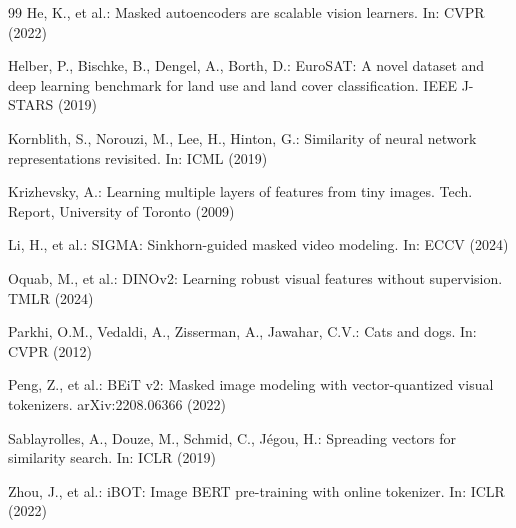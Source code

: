 \documentclass[runningheads]{llncs}
\begin{document}
\begin{thebibliography}{99}
He, K., et al.:
Masked autoencoders are scalable vision learners.
In: CVPR (2022)

Helber, P., Bischke, B., Dengel, A., Borth, D.:
EuroSAT: A novel dataset and deep learning benchmark for land use and land cover classification.
IEEE J-STARS (2019)

Kornblith, S., Norouzi, M., Lee, H., Hinton, G.:
Similarity of neural network representations revisited.
In: ICML (2019)

Krizhevsky, A.:
Learning multiple layers of features from tiny images.
Tech. Report, University of Toronto (2009)

Li, H., et al.:
SIGMA: Sinkhorn-guided masked video modeling.
In: ECCV (2024)

Oquab, M., et al.:
DINOv2: Learning robust visual features without supervision.
TMLR (2024)

Parkhi, O.M., Vedaldi, A., Zisserman, A., Jawahar, C.V.:
Cats and dogs.
In: CVPR (2012)

Peng, Z., et al.:
BEiT v2: Masked image modeling with vector-quantized visual tokenizers.
arXiv:2208.06366 (2022)

Sablayrolles, A., Douze, M., Schmid, C., J\'{e}gou, H.:
Spreading vectors for similarity search.
In: ICLR (2019)

Zhou, J., et al.:
iBOT: Image BERT pre-training with online tokenizer.
In: ICLR (2022)

\end{thebibliography}
\end{document}

